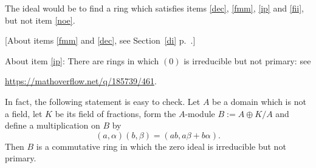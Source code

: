 \documentclass[parskip=half,fontsize=12pt]{scrartcl}%
\begin{document}
The ideal would be to find a ring which satisfies items \ref{dec}, \ref{fmm}, \ref{ip} and \ref{fii}, but not item \ref{noe}.%

[About items \ref{fmm} and \ref{dec}, see Section~\ref{di} p.~\pageref{di}.]

About item \ref{ip}: There are rings in which $(0)$ is irreducible but not primary: see 

\href{https://mathoverflow.net/q/185739/461}{https://mathoverflow.net/q/185739/461}. 

In fact, the following statement is easy to check. Let $A$ be a domain which is not a field, let $K$ be its field of fractions, form the $A$-module $B:=A\oplus K/A$ and define a multiplication on $B$ by $$(a,\alpha)(b,\beta)=(ab,a\beta+b\alpha).$$ Then $B$ is a commutative ring in which the zero ideal is irreducible but not primary. 
\end{document}
